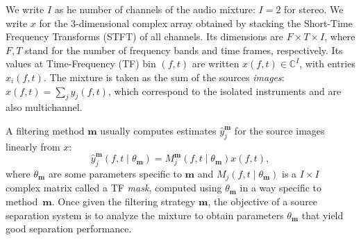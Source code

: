 \documentclass{llncs}
\newcommand{\sboxed}[1]{\textbf{#1}}
\newcommand{\thet}[1]{\theta_{\sboxed{#1}}}
\newcommand{\ft}{\left(f,t\right)}
\newcommand{\ftt}[1]{\left(f,t\mid\thet{#1}\right)}
\begin{document}
We write $I$ as he number of channels of the audio mixture: $I=2$ for stereo. We write $x$ for the 3-dimensional complex array obtained by stacking the Short-Time Frequency Transforms (STFT) of all channels. Its dimensions are $F\times T\times I$, where $F,T$ stand for the number of frequency bands and time frames, respectively. Its values at Time-Frequency (TF) bin $\ft$ are  written $x\ft\in\mathbb{C}^I$, with entries $x_i\ft$. The mixture is taken as the sum of the sources \textit{images}: $x\ft=\sum_j y_j\ft$, which correspond to the isolated instruments and are also multichannel.

A filtering method $\sboxed{m}$ usually computes estimates $\hat{y}_j^{\sboxed{m}}$ for the source images linearly from $x$:
\begin{equation}
  \hat{y}_j^{\sboxed{m}}\ftt{m}=M_j^{\sboxed{m}}\ftt{m} x\ft,\label{eq:TFmask}
\end{equation}
where $\thet{m}$ are some parameters specific to $\sboxed{m}$ and $M_j\ftt{m}$ is a $I\times I$ complex matrix called a TF \textit{mask}, computed using $\thet{m}$ in a way specific to method~$\sboxed{m}$. Once given the filtering strategy $\sboxed{m}$, the objective of a source separation system is to analyze the mixture to obtain parameters $\thet{m}$ that yield good separation performance.
\end{document}
